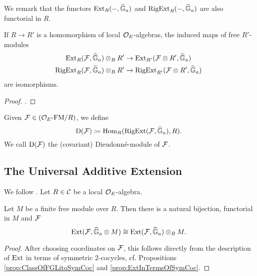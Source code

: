 \documentclass[../main.tex]{subfiles}
\begin{document}
We remark that the functors $\operatorname{Ext}_R(-,\widehat{\mathbb{G}}_a)$ and $\operatorname {RigExt}_R(-,\widehat{\mathbb{G}}_a)$ are
also functorial in $R$.
\begin{lem}
  If $R \to R'$ is a homomorphism of local ${\mathcal{O}_E}$-algebras, the induced maps 
  of free $R'$-modules
  \begin{gather*}
    \operatorname{Ext}_R(\mathcal{F}, \widehat{\mathbb{G}}_a) \otimes_R R' \to \operatorname{Ext}_{R'}(\mathcal{F} \otimes R', \widehat{\mathbb{G}}_a) \\
    \operatorname {RigExt}_R(\mathcal{F}, \widehat{\mathbb{G}}_a) \otimes_R R' \to \operatorname {RigExt}_{R'}(\mathcal{F} \otimes R', \widehat{\mathbb{G}}_a)
  \end{gather*}
  are isomorphisms.
\begin{proof}
  \cite[Corollary 9.13]{hopkins1994equivariant}.
\end{proof}
\end{lem}

\begin{defi}\label{def:DioModule}
  Given $\mathcal{F} \in {({\mathcal{O}_E}\textnormal-\allowbreak\mathrm{FM}/{R})}$, we define 
  $$\mathrm{D}(\mathcal{F}) \coloneqq \operatorname{Hom}_R(\operatorname {RigExt}(\mathcal{F}, \widehat{\mathbb{G}}_a), R).$$ 
  We call $\mathrm{D}(\mathcal{F})$ the (covariant) Dieudonn\'e-module of $\mathcal{F}$. 
\end{defi}


\subsection{The Universal Additive Extension} %
\label{sub:The Universal Additive Extension}
We follow \cite[ 11]{hopkins1994equivariant}.
Let $R \in \mathcal{C}$ be a local $\mathcal{O}_E$-algebra.

\begin{lem}
  Let $M$ be a finite free module over $R$. Then there is a natural bijection,
  functorial in $M$ and $\mathcal{F}$
  \begin{equation*}
    \operatorname{Ext}(\mathcal{F}, \widehat{\mathbb{G}}_a \otimes M) \cong \operatorname{Ext}(\mathcal{F}, \widehat{\mathbb{G}}_a) \otimes_R M.
  \end{equation*}
\begin{proof}
  After choosing coordinates on $\mathcal{F}$, this follows directly from the 
  description of $\operatorname{Ext}$ in terms of symmetric 2-cocycles, cf. Propositions
  \ref{prop:ClassOfFGLitoSymCoc} and \ref{prop:ExtInTermsOfSymCoc}.
\end{proof}
\end{lem}
\end{document}
